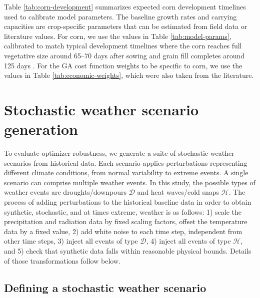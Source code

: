 \documentclass[pdflatex,sn-mathphys-num]{sn-jnl}
\begin{document}
Table \ref{tab:corn-development} summarizes expected corn development timelines used to calibrate model parameters. The baseline growth rates and carrying capacities are crop-specific parameters that can be estimated from field data or literature values. For corn, we use the values in Table \ref{tab:model-params}, calibrated to match typical development timelines where the corn reaches full vegetative size around 65--70 days after sowing and grain fill completes around 125 days \cite{corn-growth-stages}. For the GA cost function weights to be specific to corn, we use the values in Table \ref{tab:economic-weights}, which were also taken from the literature.

\section{Stochastic weather scenario generation}\label{sec:weather}

To evaluate optimizer robustness, we generate a suite of stochastic weather scenarios from historical data. Each scenario applies perturbations representing different climate conditions, from normal variability to extreme events. A single scenario can comprise multiple weather events. In this study, the possible types of weather events are droughts/downpours $\mathcal{D}$ and heat waves/cold snaps $\mathcal{H}$. The process of adding perturbations to the historical baseline data in order to obtain synthetic, stochastic, and at times extreme, weather is as follows: 1) scale the precipitation and radiation data by fixed scaling factors, offset the temperature data by a fixed value, 2) add white noise to each time step, independent from other time steps, 3) inject all events of type $\mathcal{D}$, 4) inject all events of type $\mathcal{H}$, and 5) check that synthetic data falls within reasonable physical bounds. Details of those transformations follow below.

\subsection{Defining a stochastic weather scenario}\label{subsec:weather-generation}
\end{document}

